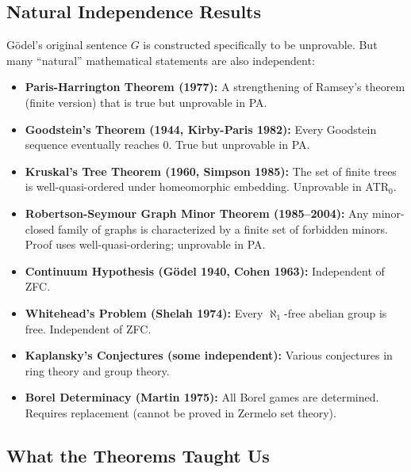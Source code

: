 \subsection{Natural Independence Results}
\label{sec:godel:natural_survey}

Gödel's original sentence $G$ is constructed specifically to be unprovable. But many ``natural'' mathematical statements are also independent:

\begin{itemize}
\item \textbf{Paris-Harrington Theorem (1977):} A strengthening of Ramsey's theorem (finite version) that is true but unprovable in PA.
\item \textbf{Goodstein's Theorem (1944, Kirby-Paris 1982):} Every Goodstein sequence eventually reaches 0. True but unprovable in PA.
\item \textbf{Kruskal's Tree Theorem (1960, Simpson 1985):} The set of finite trees is well-quasi-ordered under homeomorphic embedding. Unprovable in ATR$_0$.
\item \textbf{Robertson-Seymour Graph Minor Theorem (1985--2004):} Any minor-closed family of graphs is characterized by a finite set of forbidden minors. Proof uses well-quasi-ordering; unprovable in PA.
\item \textbf{Continuum Hypothesis (Gödel 1940, Cohen 1963):} Independent of ZFC.
\item \textbf{Whitehead's Problem (Shelah 1974):} Every $\aleph_1$-free abelian group is free. Independent of ZFC.
\item \textbf{Kaplansky's Conjectures (some independent):} Various conjectures in ring theory and group theory.
\item \textbf{Borel Determinacy (Martin 1975):} All Borel games are determined. Requires replacement (cannot be proved in Zermelo set theory).
\end{itemize}

\subsection{What the Theorems Taught Us}
\label{sec:godel:lessons}

